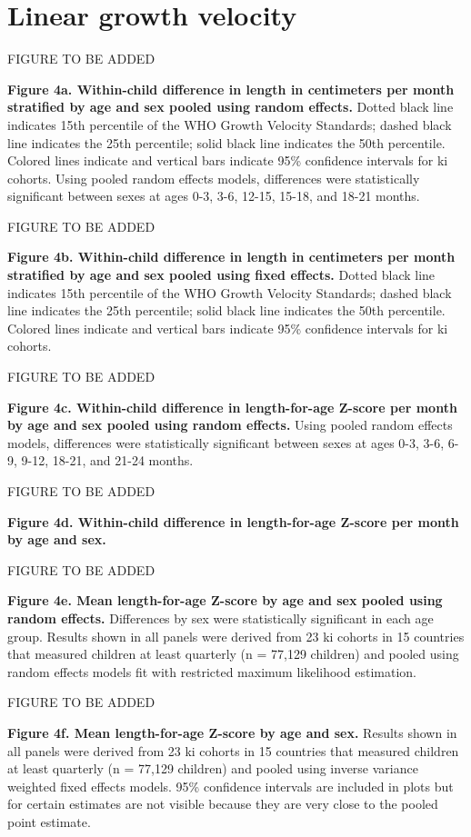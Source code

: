 \documentclass[9pt,]{book}
\begin{document}
\section{Linear growth velocity}\label{linear-growth-velocity}

FIGURE TO BE ADDED

\textbf{Figure 4a. Within-child difference in length in centimeters per
month stratified by age and sex pooled using random effects.} Dotted
black line indicates 15th percentile of the WHO Growth Velocity
Standards; dashed black line indicates the 25th percentile; solid black
line indicates the 50th percentile. Colored lines indicate and vertical
bars indicate 95\% confidence intervals for ki cohorts. Using pooled
random effects models, differences were statistically significant
between sexes at ages 0-3, 3-6, 12-15, 15-18, and 18-21 months.

FIGURE TO BE ADDED

\textbf{Figure 4b. Within-child difference in length in centimeters per
month stratified by age and sex pooled using fixed effects.} Dotted
black line indicates 15th percentile of the WHO Growth Velocity
Standards; dashed black line indicates the 25th percentile; solid black
line indicates the 50th percentile. Colored lines indicate and vertical
bars indicate 95\% confidence intervals for ki cohorts.

FIGURE TO BE ADDED

\textbf{Figure 4c. Within-child difference in length-for-age Z-score per
month by age and sex pooled using random effects.} Using pooled random
effects models, differences were statistically significant between sexes
at ages 0-3, 3-6, 6-9, 9-12, 18-21, and 21-24 months.

FIGURE TO BE ADDED

\textbf{Figure 4d. Within-child difference in length-for-age Z-score per
month by age and sex. }

FIGURE TO BE ADDED

\textbf{Figure 4e. Mean length-for-age Z-score by age and sex pooled
using random effects.} Differences by sex were statistically significant
in each age group. Results shown in all panels were derived from 23 ki
cohorts in 15 countries that measured children at least quarterly (n =
77,129 children) and pooled using random effects models fit with
restricted maximum likelihood estimation.

FIGURE TO BE ADDED

\textbf{Figure 4f. Mean length-for-age Z-score by age and sex.} Results
shown in all panels were derived from 23 ki cohorts in 15 countries that
measured children at least quarterly (n = 77,129 children) and pooled
using inverse variance weighted fixed effects models. 95\% confidence
intervals are included in plots but for certain estimates are not
visible because they are very close to the pooled point estimate.
\end{document}

